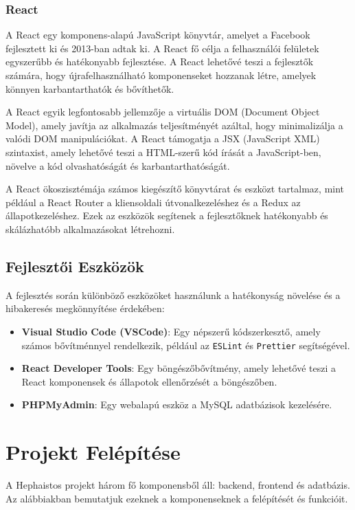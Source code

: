 \documentclass{article}
\begin{document}
\subsubsection{React}
A React egy komponens-alapú JavaScript könyvtár, amelyet a Facebook fejlesztett ki és 2013-ban adtak ki. A React fő célja a felhasználói felületek egyszerűbb és hatékonyabb fejlesztése. A React lehetővé teszi a fejlesztők számára, hogy újrafelhasználható komponenseket hozzanak létre, amelyek könnyen karbantarthatók és bővíthetők.

A React egyik legfontosabb jellemzője a virtuális DOM (Document Object Model), amely javítja az alkalmazás teljesítményét azáltal, hogy minimalizálja a valódi DOM manipulációkat. A React támogatja a JSX (JavaScript XML) szintaxist, amely lehetővé teszi a HTML-szerű kód írását a JavaScript-ben, növelve a kód olvashatóságát és karbantarthatóságát.

A React ökoszisztémája számos kiegészítő könyvtárat és eszközt tartalmaz, mint például a React Router a kliensoldali útvonalkezeléshez és a Redux az állapotkezeléshez. Ezek az eszközök segítenek a fejlesztőknek hatékonyabb és skálázhatóbb alkalmazásokat létrehozni.

\subsection{Fejlesztői Eszközök}
A fejlesztés során különböző eszközöket használunk a hatékonyság növelése és a hibakeresés megkönnyítése érdekében:
\begin{itemize}
    \item \textbf{Visual Studio Code (VSCode)}: Egy népszerű kódszerkesztő, amely számos bővítménnyel rendelkezik, például az \texttt{ESLint} és \texttt{Prettier} segítségével.
    \item \textbf{React Developer Tools}: Egy böngészőbővítmény, amely lehetővé teszi a React komponensek és állapotok ellenőrzését a böngészőben.
    \item \textbf{PHPMyAdmin}: Egy webalapú eszköz a MySQL adatbázisok kezelésére.
\end{itemize}

\section{Projekt Felépítése}
A Hephaistos projekt három fő komponensből áll: backend, frontend és adatbázis. Az alábbiakban bemutatjuk ezeknek a komponenseknek a felépítését és funkcióit.
\end{document}
